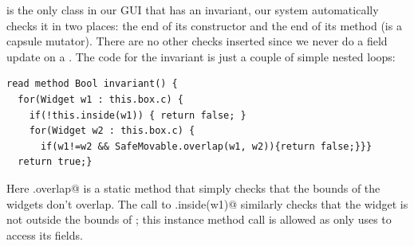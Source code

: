 \Q@SafeMovable@ is the only class in our GUI that has an invariant, our system automatically checks it in two places: the end of its constructor and the end of its \Q@dispatch@ method (is a capsule mutator). There are no other checks inserted since we never do a field update on a \Q@SafeMovable@. The code for the invariant is just a couple of simple nested loops:
\begin{lstlisting}
read method Bool invariant() {
  for(Widget w1 : this.box.c) {
    if(!this.inside(w1)) { return false; }
    for(Widget w2 : this.box.c) {
      if(w1!=w2 && SafeMovable.overlap(w1, w2)){return false;}}}
  return true;}
\end{lstlisting}
Here \Q@SafeMovable.overlap@ is a static method that simply checks that the bounds of the widgets don't overlap. The call to \Q@this.inside(w1)@ similarly checks that the widget is not outside the bounds of \Q@this@; this instance method call is allowed as \Q@inside@ only uses \Q@this@ to access its fields.%


